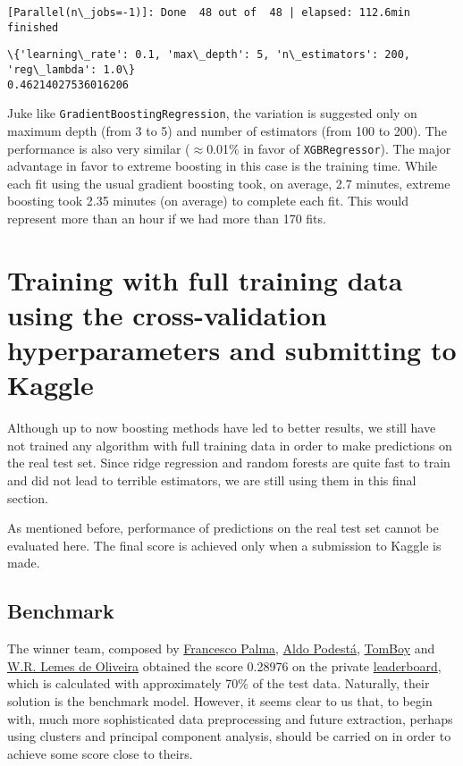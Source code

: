 \documentclass[11pt]{article}
\begin{document}
{    \begin{Verbatim}[commandchars=\\\{\}]
[Parallel(n\_jobs=-1)]: Done  48 out of  48 | elapsed: 112.6min finished
    \end{Verbatim}

    \begin{Verbatim}[commandchars=\\\{\}]
\{'learning\_rate': 0.1, 'max\_depth': 5, 'n\_estimators': 200, 'reg\_lambda': 1.0\}
0.46214027536016206
    \end{Verbatim}

    Juke like \texttt{GradientBoostingRegression}, the variation is
suggested only on maximum depth (from 3 to 5) and number of estimators
(from 100 to 200). The performance is also very similar
($\approx$0.01\% in favor of \texttt{XGBRegressor}). The major
advantage in favor to extreme boosting in this case is the training
time. While each fit using the usual gradient boosting took, on average,
2.7 minutes, extreme boosting took 2.35 minutes (on average) to complete
each fit. This would represent more than an hour if we had more than 170
fits.

\hspace{0.5cm} \section{Training with full training data using the cross-validation
hyperparameters and submitting to
Kaggle}\label{training-with-full-training-data-using-the-cross-validation-hyperparameters-and-submitting-to-kaggle}

\hspace{0.5cm} Although up to now boosting methods have led to better results, we still
have not trained any algorithm with full training data in order to make
predictions on the real test set. Since ridge regression and random
forests are quite fast to train and did not lead to terrible estimators,
we are still using them in this final section.

As mentioned before, performance of predictions on the real test set
cannot be evaluated here. The final score is achieved only when a
submission to Kaggle is made.

\subsection{Benchmark}\label{benchmark}

\hspace{0.5cm} The winner team, composed by
\href{https://www.kaggle.com/lapalma}{Francesco Palma},
\href{https://www.kaggle.com/aldopod}{Aldo Podestá},
\href{https://www.kaggle.com/tomboys}{TomBoy} and
\href{https://www.kaggle.com/wallyoliveira}{W.R. Lemes de Oliveira}
obtained the score 0.28976 on the private
\href{https://www.kaggle.com/c/nyc-taxi-trip-duration/leaderboard}{leaderboard},
which is calculated with approximately 70\% of the test data. Naturally,
their solution is the benchmark model. However, it seems clear to us
that, to begin with, much more sophisticated data preprocessing and
future extraction, perhaps using clusters and principal component
analysis, should be carried on in order to achieve some score close to
theirs.

}
\end{document}
